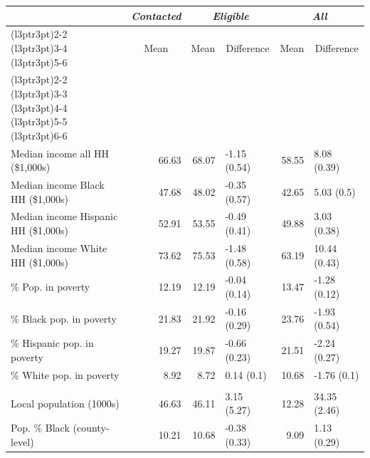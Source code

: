\begin{table}
\centering
\begin{tabular}[t]{lrrlrl}
\toprule
\multicolumn{1}{c}{\em{}} & \multicolumn{1}{c}{\em{Contacted}} & \multicolumn{2}{c}{\em{Eligible}} & \multicolumn{2}{c}{\em{All}} \\
\cmidrule(l{3pt}r{3pt}){2-2} \cmidrule(l{3pt}r{3pt}){3-4} \cmidrule(l{3pt}r{3pt}){5-6}
\multicolumn{1}{c}{} & \multicolumn{1}{c}{Mean} & \multicolumn{1}{c}{Mean} & \multicolumn{1}{c}{Difference} & \multicolumn{1}{c}{Mean} & \multicolumn{1}{c}{Difference} \\
\cmidrule(l{3pt}r{3pt}){2-2} \cmidrule(l{3pt}r{3pt}){3-3} \cmidrule(l{3pt}r{3pt}){4-4} \cmidrule(l{3pt}r{3pt}){5-5} \cmidrule(l{3pt}r{3pt}){6-6}
\addlinespace[0.3em]
\multicolumn{6}{l}{\textbf{Income (county-level)}}\\
\hspace{1em}Median income all HH (\$1,000s) & 66.63 & 68.07 & -1.15 (0.54) & 58.55 & 8.08 (0.39)\\
\hspace{1em}Median income Black HH (\$1,000s) & 47.68 & 48.02 & -0.35 (0.57) & 42.65 & 5.03 (0.5)\\
\hspace{1em}Median income Hispanic HH (\$1,000s) & 52.91 & 53.55 & -0.49 (0.41) & 49.88 & 3.03 (0.38)\\
\hspace{1em}Median income White HH (\$1,000s) & 73.62 & 75.53 & -1.48 (0.58) & 63.19 & 10.44 (0.43)\\
\hspace{1em}\% Pop. in poverty & 12.19 & 12.19 & -0.04 (0.14) & 13.47 & -1.28 (0.12)\\
\hspace{1em}\% Black pop. in poverty & 21.83 & 21.92 & -0.16 (0.29) & 23.76 & -1.93 (0.54)\\
\hspace{1em}\% Hispanic pop. in poverty & 19.27 & 19.87 & -0.66 (0.23) & 21.51 & -2.24 (0.27)\\
\hspace{1em}\% White pop. in poverty & 8.92 & 8.72 & 0.14 (0.1) & 10.68 & -1.76 (0.1)\\
\addlinespace[0.3em]
\multicolumn{6}{l}{\textbf{Population}}\\
\hspace{1em}Local population (1000s) & 46.63 & 46.11 & 3.15 (5.27) & 12.28 & 34.35 (2.46)\\
\hspace{1em}Pop. \% Black (county-level) & 10.21 & 10.68 & -0.38 (0.33) & 9.09 & 1.13 (0.29)\\

\end{tabular}
\end{table}
